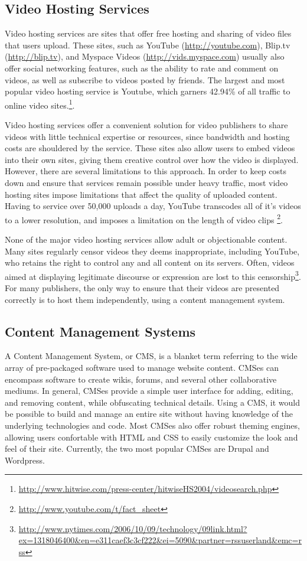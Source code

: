 \documentclass[a4paper,12pt]{report}
\begin{document}
\subsection{Video Hosting Services}
Video hosting services are sites that offer free hosting and sharing of video files that users upload.
These sites, such as YouTube (\url{http://youtube.com}), Blip.tv (\url{http://blip.tv}), and Myspace Videos (\url{http://vids.myspace.com}) usually also offer social networking features, such as the ability to rate and comment on videos, as well as subscribe to videos posted by friends.
The largest and most popular video hosting service is Youtube, which garners 42.94\% of all traffic to online video sites.\footnote{\url{http://www.hitwise.com/press-center/hitwiseHS2004/videosearch.php}}. 

Video hosting services offer a convenient solution for video publishers 
to share videos with little technical expertise or resources, since bandwidth and hosting costs are shouldered by the service. These sites also allow users to embed videos into their own sites, giving them creative control over how the video is displayed. However, there are several limitations to this approach. In order to keep costs down and ensure that services remain possible under heavy traffic, most video hosting sites impose limitations that affect the quality of uploaded content. Having to service over 50,000 uploads a day, YouTube transcodes all of it's videos to a lower resolution, and imposes a limitation on the length of video clips \footnote{\url{http://www.youtube.com/t/fact\_sheet}}. 

None of the major video hosting services allow adult or objectionable content. Many sites regularly censor videos they deems inappropriate, including YouTube, who retains the right to control any and all content on its servers. Often, videos aimed at displaying legitimate discourse or expression are lost to this censorship\footnote{\url{http://www.nytimes.com/2006/10/09/technology/09link.html?ex=1318046400&en=e311caef3c3cf222&ei=5090&partner=rssuserland&emc=rss}}. For many publishers, the only way to ensure that their videos are presented correctly is to host them independently, using a content management system.

\subsection{Content Management Systems}

A Content Management System, or CMS, is a blanket term referring to the wide array of pre-packaged software used to manage website content. CMSes can encompass software to create wikis, forums, and several other collaborative mediums. In general, CMSes provide a simple user interface for adding, editing, and removing content, while obfuscating technical details. Using a CMS, it would be possible to build and manage an entire site without having knowledge of the underlying technologies and code. Most CMSes also offer robust theming engines, allowing users confortable with HTML and CSS to easily customize the look and feel of their site. Currently, the two most popular CMSes are Drupal and Wordpress.
\end{document}
